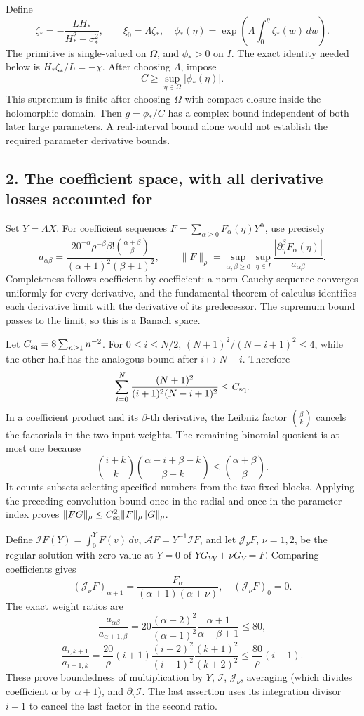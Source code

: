 \documentclass[10pt,a4paper]{article}
\begin{document}
Define
\[
\zeta_*=-\frac{LH_*}{H_*^2+\sigma_*^2},\qquad \xi_0=\Lambda\zeta_*,
\quad\phi_*(\eta)=\exp\left(\Lambda\int_0^\eta\zeta_*(w)\,dw\right).
\]
The primitive is single-valued on \(\Omega\), and \(\phi_*>0\) on \(I\). The exact identity needed below is \(H_*\zeta_*/L=-\chi\). After choosing \(\Lambda\), impose
\[
C\ge\sup_{\eta\in\Omega}|\phi_*(\eta)|.
\]
This supremum is finite after choosing \(\Omega\) with compact closure inside the holomorphic domain. Then \(g=\phi_*/C\) has a complex bound independent of both later large parameters. A real-interval bound alone would not establish the required parameter derivative bounds.

\subsection{2. The coefficient space, with all derivative losses accounted for}

Set \(Y=\Lambda X\). For coefficient sequences \(F=\sum_{\alpha\ge0}F_\alpha(\eta)Y^\alpha\), use precisely
\[
a_{\alpha\beta}=
\frac{20^{-\alpha}\rho^{-\beta}\beta!\binom{\alpha+\beta}{\beta}}
{(\alpha+1)^2(\beta+1)^2},
\qquad
\|F\|_\rho=\sup_{\alpha,\beta\ge0}\sup_{\eta\in I}
\frac{|\partial_\eta^\beta F_\alpha(\eta)|}{a_{\alpha\beta}}.
\]
Completeness follows coefficient by coefficient: a norm-Cauchy sequence converges uniformly for every derivative, and the fundamental theorem of calculus identifies each derivative limit with the derivative of its predecessor. The supremum bound passes to the limit, so this is a Banach space.

Let \(C_{\rm sq}=8\sum_{n\ge1}n^{-2}\). For \(0\le i\le N/2\), \((N+1)^2/(N-i+1)^2\le4\), while the other half has the analogous bound after \(i\mapsto N-i\). Therefore
\[
\sum_{i=0}^N\frac{(N+1)^2}{(i+1)^2(N-i+1)^2}\le C_{\rm sq}.
\]
In a coefficient product and its \(\beta\)-th derivative, the Leibniz factor \(\binom\beta k\) cancels the factorials in the two input weights. The remaining binomial quotient is at most one because
\[
\binom{i+k}{k}\binom{\alpha-i+\beta-k}{\beta-k}
\le\binom{\alpha+\beta}{\beta}.
\]
It counts subsets selecting specified numbers from the two fixed blocks. Applying the preceding convolution bound once in the radial and once in the parameter index proves
\(\|FG\|_\rho\le C_{\rm sq}^2\|F\|_\rho\|G\|_\rho\).

Define \(\mathcal I F(Y)=\int_0^YF(v)\,dv\), \(\mathcal A F=Y^{-1}\mathcal I F\), and let \(\mathcal J_\nu F\), \(\nu=1,2\), be the regular solution with zero value at \(Y=0\) of \(YG_{YY}+\nu G_Y=F\). Comparing coefficients gives
\[
(\mathcal J_\nu F)_{\alpha+1}=\frac{F_\alpha}{(\alpha+1)(\alpha+\nu)},
\quad (\mathcal J_\nu F)_0=0.
\]
The exact weight ratios are
\[
\frac{a_{\alpha\beta}}{a_{\alpha+1,\beta}}
=20\frac{(\alpha+2)^2}{(\alpha+1)^2}
\frac{\alpha+1}{\alpha+\beta+1}\le80,
\]
\[
\frac{a_{i,k+1}}{a_{i+1,k}}
=\frac{20}{\rho}(i+1)\frac{(i+2)^2}{(i+1)^2}
\frac{(k+1)^2}{(k+2)^2}\le\frac{80}{\rho}(i+1).
\]
These prove boundedness of multiplication by \(Y\), \(\mathcal I\), \(\mathcal J_\nu\), averaging (which divides coefficient \(\alpha\) by \(\alpha+1\)), and \(\partial_\eta\mathcal I\). The last assertion uses its integration divisor \(i+1\) to cancel the last factor in the second ratio.
\end{document}
